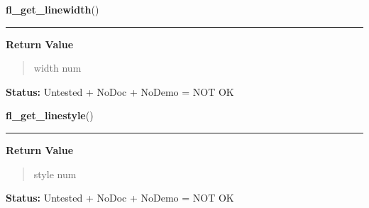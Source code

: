     \label{xformslib:library:fl_get_linewidth}

    \vspace{0.5ex}

\hspace{.8\funcindent}\begin{boxedminipage}{\funcwidth}

    \raggedright \textbf{fl\_get\_linewidth}()

    \vspace{-1.5ex}

    \rule{\textwidth}{0.5\fboxrule}
\setlength{\parskip}{2ex}
\setlength{\parskip}{1ex}
      \textbf{Return Value}
    \vspace{-1ex}

      \begin{quote}
      width num

      \end{quote}

\textbf{Status:} Untested + NoDoc + NoDemo = NOT OK



    \end{boxedminipage}

    \label{xformslib:library:fl_get_linestyle}

    \vspace{0.5ex}

\hspace{.8\funcindent}\begin{boxedminipage}{\funcwidth}

    \raggedright \textbf{fl\_get\_linestyle}()

    \vspace{-1.5ex}

    \rule{\textwidth}{0.5\fboxrule}
\setlength{\parskip}{2ex}
\setlength{\parskip}{1ex}
      \textbf{Return Value}
    \vspace{-1ex}

      \begin{quote}
      style num

      \end{quote}

\textbf{Status:} Untested + NoDoc + NoDemo = NOT OK



    \end{boxedminipage}

